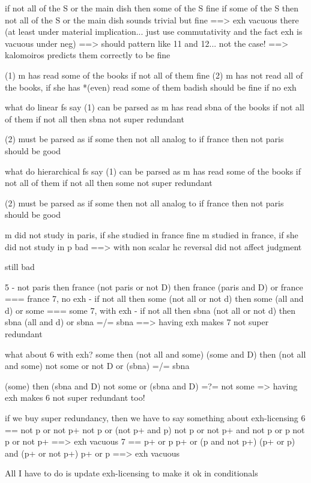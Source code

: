 if not all of the S or the main dish then some of the S fine
if some of the S then not all of the S or the main dish sounds trivial but fine
==> exh vacuous there (at least under material implication... just use commutativity and the fact exh is vacuous under neg)
==> should pattern like 11 and 12... not the case!
==> kalomoiros predicts them correctly to be fine


(1) m has read some of the books if not all of them fine 
(2) m has not read all of the books, if she has *(even) read some of them badish should be fine if no exh

what do linear fs say
(1) can be parsed as
m has read sbna of the books if not all of them
if not all then sbna not super redundant

(2) must be parsed as 
if some then not all
analog to if france then not paris should be good


what do hierarchical fs say
(1) can be parsed as
m has read some of the books if not all of them
if not all then some not super redundant

(2) must be parsed as 
if some then not all
analog to if france then not paris should be good



m did not study in paris, if she studied in france fine
m studied in france, if she did not study in p bad
==> with non scalar hc reversal did not affect judgment


\begin{exe}
	 still bad
\end{exe}
5 - not paris then france
(not paris or not D) then france
(paris and D) or france === france
7, no exh - if not all then some
(not all or not d) then some
(all and d) or some === some 
7, with exh - if not all then sbna
(not all or not d) then sbna
(all and d) or sbna =/= sbna
==> having exh makes 7 not super redundant

what about 6 with exh?
some then (not all and some)
(some and D) then (not all and some)
not some or not D or (sbna)  =/= sbna 

(some) then (sbna and D)
not some or (sbna and D) =?= not some
=> having exh makes 6 not super redundant too!

if we buy super redundancy, then we have to say something about exh-licensing
6 == not p or not p+
not p or (not p+ and p)
not p or not p+ and not p or p
not p or not p+
==> exh vacuous
7 == p+ or p
p+ or (p and not p+)
(p+ or p) and (p+ or not p+)
p+ or p
==> exh vacuous

All I have to do is update exh-licensing to make it ok in conditionals
